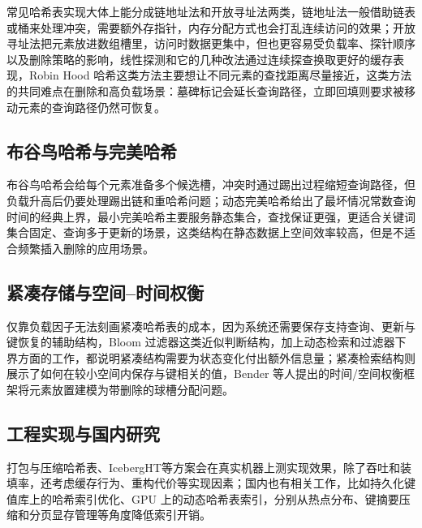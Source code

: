 常见哈希表实现大体上能分成链地址法和开放寻址法\cite{bender2024sosa}两类，链地址法一般借助链表或桶来处理冲突，需要额外存指针，内存分配方式也会打乱连续访问的效果；开放寻址法把元素放进数组槽里，访问时数据更集中，但也更容易受负载率、探针顺序以及删除策略的影响，线性探测和它的几种改法通过连续探查换取更好的缓存表现\cite{pagh2004linear,thorup2012tabulation}，Robin Hood 哈希这类方法主要想让不同元素的查找距离尽量接近\cite{conway2018}，这类方法的共同难点在删除和高负载场景：墓碑标记\cite{knuth1998sorting}会延长查询路径，立即回填则要求被移动元素的查询路径仍然可恢复。

\subsection{布谷鸟哈希与完美哈希}

布谷鸟哈希\cite{pagh2004cuckoo,lehmann2023sichash}会给每个元素准备多个候选槽，冲突时通过踢出过程缩短查询路径，但负载升高后仍要处理踢出链和重哈希问题；动态完美哈希\cite{dietzfelbinger1994}给出了最坏情况常数查询时间的经典上界，最小完美哈希\cite{lehmann2026mphsurvey,lehmann2024shockhash,hermann2024phobic,pibiri2021pthash,esposito2020recsplit}主要服务静态集合，查找保证更强，更适合关键词集合固定、查询多于更新的场景，这类结构在静态数据上空间效率较高，但是不适合频繁插入删除的应用场景。

\subsection{紧凑存储与空间--时间权衡}

仅靠负载因子无法刻画紧凑哈希表的成本，因为系统还需要保存支持查询、更新与键恢复的辅助结构，Bloom 过滤器\cite{bloom1970,broder2003bloom}这类近似判断结构，加上动态检索和过滤器下界方面的工作\cite{kuszmaul2024filters}，都说明紧凑结构需要为状态变化付出额外信息量；紧凑检索结构\cite{pagh2008retrieval}则展示了如何在较小空间内保存与键相关的值，Bender 等人提出的时间/空间权衡框架\cite{bender2022otsh}将元素放置建模为带删除的球槽分配问题\cite{aamand2021dynamic,bansal2022deletions}。

\subsection{工程实现与国内研究}

打包与压缩哈希表\cite{kurpicz2023pachash}、IcebergHT\cite{pandey2023iceberght,bender2024iceberg}等方案会在真实机器上测实现效果，除了吞吐和装填率，还考虑缓存行为、重构代价等实现因素；国内也有相关工作，比如持久化键值库上的哈希索引优化\cite{wang2024hotaware}、GPU 上的动态哈希表索引\cite{xiong2022starfish}，分别从热点分布、键摘要压缩和分页显存管理等角度降低索引开销。

